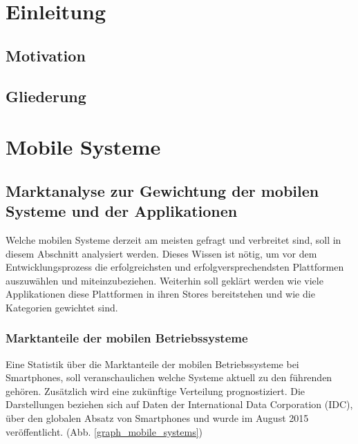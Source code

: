 \section*{\centering\abstractname}



\chapter{Einleitung}

\section{Motivation}
\section{Gliederung}

\chapter{Mobile Systeme}

\section{Marktanalyse zur Gewichtung der mobilen Systeme und der Applikationen}
Welche mobilen Systeme derzeit am meisten gefragt und verbreitet sind, soll in diesem Abschnitt analysiert werden. Dieses Wissen ist nötig, um vor dem Entwicklungsprozess die erfolgreichsten und erfolgversprechendsten Plattformen auszuwählen und miteinzubeziehen.
Weiterhin soll geklärt werden wie viele Applikationen diese Plattformen in ihren Stores bereitstehen und wie die Kategorien gewichtet sind.

\subsection{Marktanteile der mobilen Betriebssysteme}
\label{subsec:Marktanteile_mobile_Systeme}
Eine Statistik über die Marktanteile der mobilen Betriebssysteme bei Smartphones, soll veranschaulichen welche Systeme aktuell zu den führenden gehören. Zusätzlich wird eine zukünftige Verteilung prognostiziert. Die Darstellungen beziehen sich auf Daten der International Data Corporation (IDC), über den globalen Absatz von Smartphones und wurde im August 2015 veröffentlicht. (Abb. \ref{graph_mobile_systems})


